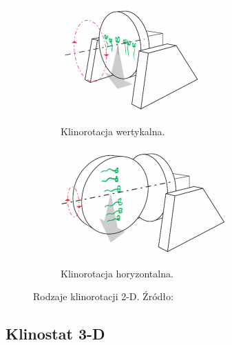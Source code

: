 \begin{figure}
	
	\centering
		\begin{subfigure}[b]{.49\textwidth}
		\centering
		\includegraphics[width=.7\textwidth]{klinorot_wert}
		\caption{Klinorotacja wertykalna.} 
		\label{fig:klinorot_wert}
	\end{subfigure}
	\hfill%
	\begin{subfigure}[b]{.49\textwidth}
		\centering
		\includegraphics[width=.7\textwidth]{klinorot_hor}
		\caption{Klinorotacja horyzontalna.} 
		\label{fig:klinorot_hor}
	\end{subfigure}

	\caption{Rodzaje klinorotacji 2-D. Źródło: \cite{bib:klinorotacja}} 
	\label{fig:klinorotacje}
	
\end{figure}

\subsection{Klinostat 3-D} \label{klinostat3d}

